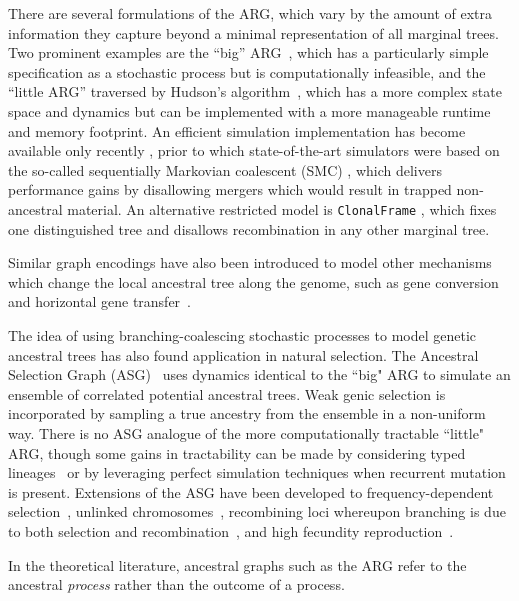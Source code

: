 \documentclass{article}
\begin{document}
There are several formulations of the ARG, which vary by
the amount of extra information they capture beyond a minimal representation
of all marginal trees. Two prominent examples are the ``big''
ARG~\citep{ethier1990two}, which has a particularly simple specification as a
stochastic process but is computationally infeasible, and the ``little ARG''
traversed by Hudson's algorithm~\citep{hudson1983properties}, which
has a more complex state space and dynamics but can be implemented with 
a more manageable runtime and memory footprint. An efficient simulation
implementation has become available only recently \citep{kelleher2016efficient},
prior to which state-of-the-art simulators were based on the so-called sequentially
Markovian coalescent (SMC) \citep{mcvean2005approximating}, which delivers
performance gains by disallowing mergers which would result in trapped
non-ancestral material. An alternative restricted model is
\texttt{ClonalFrame}  \citep{didelot2007inference}, which fixes one distinguished
tree and disallows recombination in any other marginal tree.

Similar graph encodings have also been introduced to model other mechanisms
which change the local ancestral tree along the genome, such as gene
conversion~\citep{wiuf2000coalescent} and
horizontal gene transfer~\citep{baumdicker2014infinitely}.

The idea of using branching-coalescing stochastic processes 
to model genetic ancestral trees has also found application in natural selection.
The Ancestral Selection Graph (ASG)~\citep{krone1997ancestral,neuhauser1997genealogy}
uses dynamics identical to the ``big" ARG to simulate an ensemble of correlated
potential ancestral trees. Weak genic selection is incorporated by sampling a 
true ancestry from the ensemble in a non-uniform way.
There is no ASG analogue of the more computationally tractable ``little" ARG,
though some gains in tractability can be made by considering typed 
lineages~\citep{etheridge2009coalescent} or by leveraging perfect simulation
techniques when recurrent mutation is present\citep{fearnhead2001perfect}.
Extensions of the ASG have been developed to frequency-dependent 
selection~\citep{neuhauser1999ancestral, gonzalezcasanova2018duality},
unlinked chromosomes~\citep{fearnhead2003ancestral}, recombining
loci whereupon branching is due to both selection and
recombination~\citep{donnelly1999genealogical}, and high fecundity 
reproduction~\citep{gonzalezcasanova2018duality, koskela2019robust}.

In the theoretical literature, ancestral graphs such as the ARG refer to the
ancestral \emph{process} rather than the outcome of a process.
\end{document}

